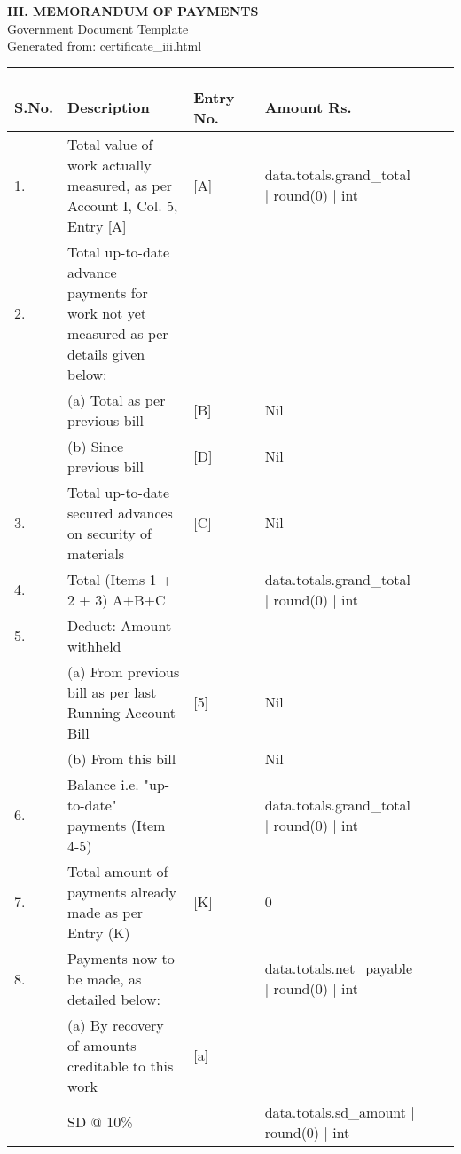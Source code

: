 \documentclass[11pt, portrait]{article}
\begin{document}
\begin{center}
{\LARGE \textbf{III. MEMORANDUM OF PAYMENTS}}\\[0.5cm]
{\large Government Document Template}\\[0.4cm]
{\normalsize Generated from: certificate\_iii.html}\\[0.3cm]
\rule{\textwidth}{0.8pt}
\end{center}

\vspace{1cm}

\begin{longtable}{|p{1.82mm}|p{17.12mm}|p{121.87mm}|p{4.03mm}|p{17.72mm}|p{4.03mm}|p{13.49mm}|}
\hline
\textbf{S.No.} & \textbf{Description} & \textbf{Entry No.} & & \textbf{Amount Rs.} & & \\
\hline
\endhead
1. & Total value of work actually measured, as per Account I, Col. 5, Entry [A] & [A] & & {{ data.totals.grand_total | round(0) | int }} & & \\
\hline
2. & Total up-to-date advance payments for work not yet measured as per details given below: & & & & & \\
\hline
& (a) Total as per previous bill & [B] & & Nil & & \\
\hline
& (b) Since previous bill & [D] & & Nil & & \\
\hline
3. & Total up-to-date secured advances on security of materials & [C] & & Nil & & \\
\hline
4. & Total (Items 1 + 2 + 3) A+B+C & & & {{ data.totals.grand_total | round(0) | int }} & & \\
\hline
5. & Deduct: Amount withheld & & & & & \\
\hline
& (a) From previous bill as per last Running Account Bill & [5] & & Nil & & \\
\hline
& (b) From this bill & & & Nil & & \\
\hline
6. & Balance i.e. "up-to-date" payments (Item 4-5) & & & {{ data.totals.grand_total | round(0) | int }} & & \\
\hline
7. & Total amount of payments already made as per Entry (K) & [K] & & 0 & & \\
\hline
8. & Payments now to be made, as detailed below: & & & {{ data.totals.net_payable | round(0) | int }} & & \\
\hline
& (a) By recovery of amounts creditable to this work & [a] & & & & \\
\hline
& SD @ 10\% & & & {{ data.totals.sd_amount | round(0) | int }} & & \\

\end{longtable}
\end{document}

